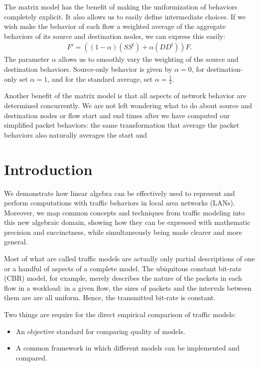 \documentclass[conference]{IEEEtran}
\newcommand{\caps}[1]{{\small{#1}}}
\begin{document}
The matrix model has the benefit of making the uniformization of behaviors completely explicit. It also allows us to easily define intermediate choices. If we wish make the behavior of each flow a weighted average of the aggregate behaviors of its source and destination nodes, we can express this easily:
\begin{align}
F' = ((1-\alpha)(SS^t)+\alpha(DD^t))F.
\end{align}
The parameter $\alpha$ allows us to smoothly vary the weighting of the source and destination behaviors. Source-only behavior is given by $\alpha=0$, for destination-only set $\alpha=1$, and for the standard average, set $\alpha=\frac{1}{2}$.

Another benefit of the matrix model is that all aspects of network behavior are determined concurrently. We are not left wondering what to do about source and destination nodes or flow start and end times after we have computed our simplified packet behaviors: the same transformation that average the packet behaviors also naturally averages the start and

\section{Introduction}\label{sec:intro}

We demonstrate how linear algebra can be effectively used to represent and perform computations with traffic behaviors in local area networks (\caps{LAN}s). Moreover, we map common concepts and techniques from traffic modeling into this new algebraic domain, showing how they can be expressed with mathematic precision and succinctness, while simultaneously being made clearer and more general.

Most of what are called traffic models are actually only partial descriptions of one or a handful of aspects of a complete model. The ubiquitous constant bit-rate (\caps{CBR}) model, for example, merely describes the nature of the packets in each flow in a workload: in a given flow, the sizes of packets and the intervals between them are are all uniform. Hence, the transmitted bit-rate is constant.

Two things are require for the direct empirical comparison of traffic models:
\begin{itemize}
\item An objective standard for comparing quality of models.
\item A common framework in which different models can be implemented and compared.
\end{itemize}
\end{document}

